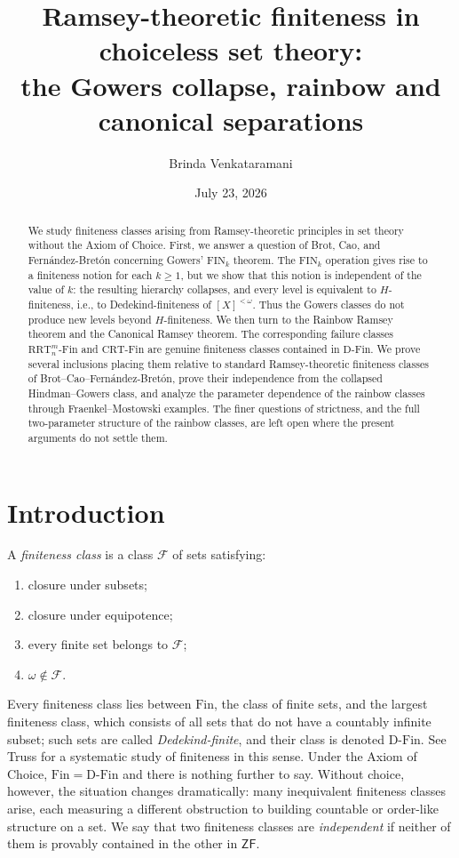 \documentclass[11pt]{amsart}
\title[Ramsey-theoretic finiteness in choiceless set theory]
{Ramsey-theoretic finiteness in choiceless set theory:\\ the Gowers collapse, rainbow and canonical separations}
\author{Brinda Venkataramani}
\date{July 23, 2026}
\theoremstyle{definition}
\newcommand{\ZF}{\mathsf{ZF}}
\newcommand{\Fin}{\mathrm{Fin}}
\newcommand{\DFin}{\mathrm{D\text{-}Fin}}
\newcommand{\FIN}{\mathrm{FIN}}
\newcommand{\RRT}{\mathrm{RRT}}
\newcommand{\CRT}{\mathrm{CRT}}
\newcommand{\RRTFin}[2]{\RRT^{#1}_{#2}\text{-}\mathrm{Fin}}
\newcommand{\CRTFin}{\CRT\text{-}\mathrm{Fin}}
\begin{document}
\begin{abstract}
We study finiteness classes arising from Ramsey-theoretic principles in set theory without the Axiom of Choice.  First, we answer a question of Brot, Cao, and Fern\'andez-Bret\'on concerning Gowers' \(\FIN_k\) theorem.  The \(\FIN_k\) operation gives rise to a finiteness notion for each \(k\geq 1\), but we show that this notion is independent of the value of \(k\): the resulting hierarchy collapses, and every level is equivalent to \(H\)-finiteness, i.e., to Dedekind-finiteness of \([X]^{<\omega}\). Thus the Gowers classes do not produce new levels beyond \(H\)-finiteness.  We then turn to the Rainbow Ramsey theorem and the Canonical Ramsey theorem.  The corresponding failure classes \(\RRTFin{m}{n}\) and \(\CRTFin\) are genuine finiteness classes contained in \(\DFin\).  We prove several inclusions placing them relative to standard Ramsey-theoretic finiteness classes of Brot--Cao--Fern\'andez-Bret\'on, prove their independence from the collapsed Hindman--Gowers class, and analyze the parameter dependence of the rainbow classes through Fraenkel--Mostowski examples.  The finer questions of strictness, and the full two-parameter structure of the rainbow classes, are left open where the present arguments do not settle them.
\end{abstract}

\maketitle

\section{Introduction}

A \emph{finiteness class} is a class \(\mathcal F\) of sets satisfying:
\begin{enumerate}[label=(\roman*)]
    \item closure under subsets;
    \item closure under equipotence;
    \item every finite set belongs to \(\mathcal F\);
    \item \(\omega\notin \mathcal F\).
\end{enumerate}
Every finiteness class lies between \(\Fin\), the class of finite sets, and the largest finiteness class, which consists of all sets that do not have a countably infinite subset; such sets are called \emph{Dedekind-finite}, and their class is denoted \(\DFin\).  See Truss \cite{TrussFiniteness} for a systematic study of finiteness in this sense.  Under the Axiom of Choice, \(\Fin=\DFin\) and there is nothing further to say.  Without choice, however, the situation changes dramatically: many inequivalent finiteness classes arise, each measuring a different obstruction to building countable or order-like structure on a set.  We say that two finiteness classes are \emph{independent} if neither of them is provably contained in the other in \(\ZF\).
\end{document}
